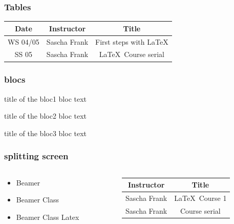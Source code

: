 \documentclass{beamer}
\begin{document}
\begin{frame}\frametitle{Tables}
\begin{tabular}{|c|c|c|}
\hline
\textbf{Date} & \textbf{Instructor} & \textbf{Title} \\
\hline
WS 04/05 & Sascha Frank & First steps with  \LaTeX  \\
\hline
SS 05 & Sascha Frank & \LaTeX \ Course serial \\
\hline
\end{tabular}
\end{frame}

\begin{frame}\frametitle{blocs}

\begin{block}{title of the bloc1}
bloc text
\end{block}

\begin{exampleblock}{title of the bloc2}
bloc text
\end{exampleblock}


\begin{alertblock}{title of the bloc3}
bloc text
\end{alertblock}

\end{frame}


\begin{frame}\frametitle{splitting screen}
\begin{columns}
\begin{column}{5cm}
\begin{itemize}
\item Beamer 
\item Beamer Class 
\item Beamer Class Latex 
\end{itemize}
\end{column}
\begin{column}{5cm}
\begin{tabular}{|c|c|}
\hline
\textbf{Instructor} & \textbf{Title} \\
\hline
Sascha Frank &  \LaTeX \ Course 1 \\
\hline
Sascha Frank &  Course serial  \\
\hline
\end{tabular}
\end{column}
\end{columns}
\end{frame}
\end{document}
